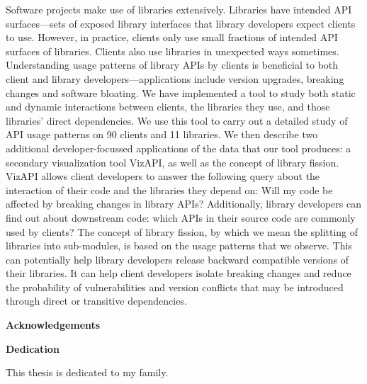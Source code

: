 Software projects make use of libraries extensively. Libraries have intended API surfaces—sets of exposed library interfaces that library developers expect clients to use. However, in practice, clients only use small fractions of intended API surfaces of libraries. Clients also use libraries in unexpected ways sometimes. Understanding usage patterns of library APIs by clients is beneficial to both client and library developers—applications include version upgrades, breaking changes and software bloating. We have implemented a tool to study both static and dynamic interactions between clients, the libraries they use, and those libraries’ direct dependencies. We use this tool to carry out a detailed study of API usage patterns on 90 clients and 11 libraries. We then describe two additional developer-focussed applications of the data that our tool produces: a secondary visualization tool VizAPI, as well as the concept of library fission. VizAPI allows client developers to answer the following query about the interaction of their code and the libraries they depend on: Will my code be affected by breaking changes in library APIs? Additionally, library developers can find out about downstream code: which APIs in their source code are commonly used by clients? The concept of library fission, by which we mean the splitting of libraries into sub-modules, is based on the usage patterns that we observe. This can potentially help library developers release backward compatible versions of their libraries. It can help client developers isolate breaking changes and reduce the probability of vulnerabilities and version conflicts that may be introduced through direct or transitive dependencies. 

\cleardoublepage


\begin{center}\textbf{Acknowledgements}\end{center}


\cleardoublepage


\begin{center}\textbf{Dedication}\end{center}

This thesis is dedicated to my family.
\cleardoublepage

\renewcommand\contentsname{Table of Contents}
\tableofcontents
\cleardoublepage
{}    %

